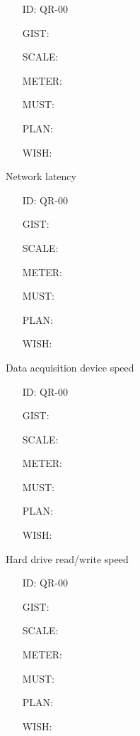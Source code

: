        \begin{itemize}
          \setlength{\itemindent}{.5in}
          \itemsep .15em
          \item[ID:] QR-00
          \item[GIST:]
          \item[SCALE:]
          \item[METER:]
          \item[MUST:]
          \item[PLAN:]
          \item[WISH:]
        \end{itemize}

        Network latency

        \begin{itemize}
          \setlength{\itemindent}{.5in}
          \itemsep .15em
          \item[ID:] QR-00
          \item[GIST:]
          \item[SCALE:]
          \item[METER:]
          \item[MUST:]
          \item[PLAN:]
          \item[WISH:]
        \end{itemize}

        Data acquisition device speed

        \begin{itemize}
          \setlength{\itemindent}{.5in}
          \itemsep .15em
          \item[ID:] QR-00
          \item[GIST:]
          \item[SCALE:]
          \item[METER:]
          \item[MUST:]
          \item[PLAN:]
          \item[WISH:]
        \end{itemize}

        Hard drive read/write speed

        \begin{itemize}
          \setlength{\itemindent}{.5in}
          \itemsep .15em
          \item[ID:] QR-00
          \item[GIST:]
          \item[SCALE:]
          \item[METER:]
          \item[MUST:]
          \item[PLAN:]
          \item[WISH:]
        \end{itemize}

